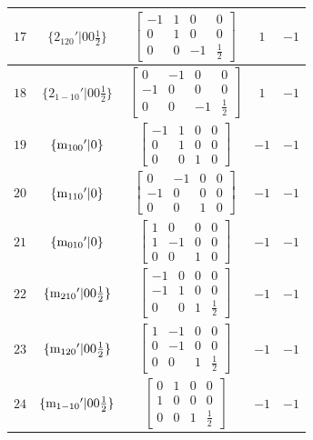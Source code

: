 \documentclass[fleqn,8pt]{jsarticle}
\begin{document}
\begin{longtable}{ccccc}
$ 17 $ & $ \{2{}_{120}{}'|0 0 \frac{1}{2}\} $ & $ \begin{bmatrix} -1 & 1 & 0 & 0 \\ 0 & 1 & 0 & 0 \\ 0 & 0 & -1 & \frac{1}{2} \end{bmatrix} $ & $ 1 $ & $ -1 $ \\ \hline
$ 18 $ & $ \{2{}_{1-10}{}'|0 0 \frac{1}{2}\} $ & $ \begin{bmatrix} 0 & -1 & 0 & 0 \\ -1 & 0 & 0 & 0 \\ 0 & 0 & -1 & \frac{1}{2} \end{bmatrix} $ & $ 1 $ & $ -1 $ \\ \hline
$ 19 $ & $ \{{\rm m}_{100}{}'|0\} $ & $ \begin{bmatrix} -1 & 1 & 0 & 0 \\ 0 & 1 & 0 & 0 \\ 0 & 0 & 1 & 0 \end{bmatrix} $ & $ -1 $ & $ -1 $ \\ \hline
$ 20 $ & $ \{{\rm m}_{110}{}'|0\} $ & $ \begin{bmatrix} 0 & -1 & 0 & 0 \\ -1 & 0 & 0 & 0 \\ 0 & 0 & 1 & 0 \end{bmatrix} $ & $ -1 $ & $ -1 $ \\ \hline
$ 21 $ & $ \{{\rm m}_{010}{}'|0\} $ & $ \begin{bmatrix} 1 & 0 & 0 & 0 \\ 1 & -1 & 0 & 0 \\ 0 & 0 & 1 & 0 \end{bmatrix} $ & $ -1 $ & $ -1 $ \\ \hline
$ 22 $ & $ \{{\rm m}_{210}{}'|0 0 \frac{1}{2}\} $ & $ \begin{bmatrix} -1 & 0 & 0 & 0 \\ -1 & 1 & 0 & 0 \\ 0 & 0 & 1 & \frac{1}{2} \end{bmatrix} $ & $ -1 $ & $ -1 $ \\ \hline
$ 23 $ & $ \{{\rm m}_{120}{}'|0 0 \frac{1}{2}\} $ & $ \begin{bmatrix} 1 & -1 & 0 & 0 \\ 0 & -1 & 0 & 0 \\ 0 & 0 & 1 & \frac{1}{2} \end{bmatrix} $ & $ -1 $ & $ -1 $ \\ \hline
$ 24 $ & $ \{{\rm m}_{1-10}{}'|0 0 \frac{1}{2}\} $ & $ \begin{bmatrix} 0 & 1 & 0 & 0 \\ 1 & 0 & 0 & 0 \\ 0 & 0 & 1 & \frac{1}{2} \end{bmatrix} $ & $ -1 $ & $ -1 $ \\
\end{longtable}
\end{document}
